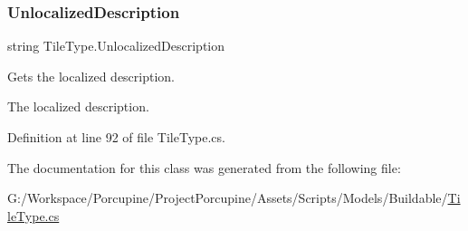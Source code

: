 \subsubsection{\texorpdfstring{Unlocalized\+Description}{UnlocalizedDescription}}
{\footnotesize\ttfamily string Tile\+Type.\+Unlocalized\+Description\hspace{0.3cm}{\ttfamily [get]}}



Gets the localized description. 

The localized description.

Definition at line 92 of file Tile\+Type.\+cs.



The documentation for this class was generated from the following file\+:\begin{DoxyCompactItemize}
\item 
G\+:/\+Workspace/\+Porcupine/\+Project\+Porcupine/\+Assets/\+Scripts/\+Models/\+Buildable/\hyperlink{_tile_type_8cs}{Tile\+Type.\+cs}\end{DoxyCompactItemize}
